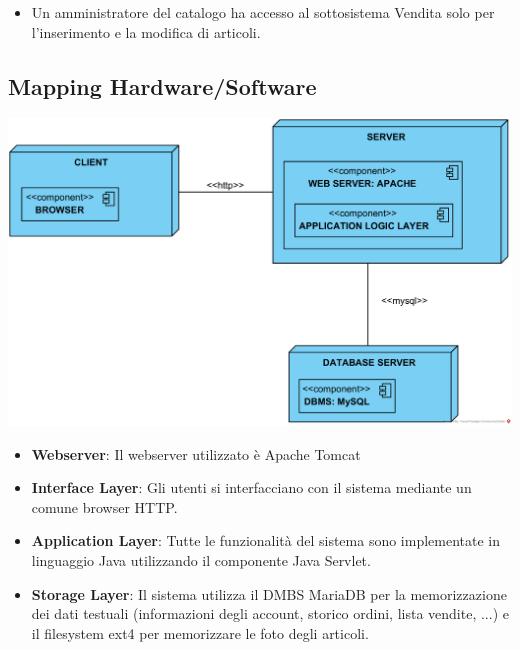 \documentclass[12pt,a4paper]{article}
\begin{document}
\begin{itemize}
\item Un amministratore del catalogo ha accesso al sottosistema Vendita solo per l'inserimento e la modifica di articoli.
\end{itemize}

\subsection{Mapping Hardware/Software}
\begin{center}
\includegraphics[height=0.34\textheight]{MappingHardWare_Software}
\end{center}

\begin{itemize}
\item \textbf{Webserver}: Il webserver utilizzato è Apache Tomcat %
\item \textbf{Interface Layer}: Gli utenti si interfacciano con il sistema mediante un comune browser HTTP.
\item \textbf{Application Layer}: Tutte le funzionalità del sistema sono implementate in linguaggio Java utilizzando il componente Java Servlet.
\item \textbf{Storage Layer}: Il sistema utilizza il DMBS MariaDB per la memorizzazione dei dati testuali (informazioni degli account, storico ordini, lista vendite, ...) e il filesystem ext4 per memorizzare le foto degli articoli.
\end{itemize}

\newpage
\end{document}
